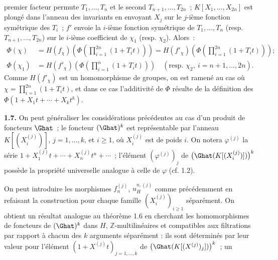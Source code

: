 premier facteur permute \(T_1,\ldots,T_n\) et le second \(T_{n+1},\ldots,T_{2n}\)~; \(K[X_1,\ldots,X_{2n}]\) est plongé dans l'anneau des invariants en envoyant \(X_j\) sur le \(j\)-ième fonction symétrique des \(T_i\)~; \(f'\) envoie la \(i\)-ième fonction symétrique de \(T_1,\ldots,T_n\) (resp. \(T_{n+1},\ldots,T_{2n}\)) sur le \(i\)-ième coefficient de \(\chi_1\) (resp. \(\chi_2\)). Alors~:
\[
\begin{aligned}
\Phi(\chi)
&=H(f_\chi)\left(\Phi\left(\prod_{i=1}^{2n}(1+T_it)\right)\right)
=H(f'_\chi)\left(\Phi\left(\prod_{i=1}^{2n}(1+T_it)\right)\right);\\
\Phi(\chi_1) &=H(f'_\chi)\left(\Phi\left(\prod_{i=1}^{n}(1+T_it)\right)\right)\quad(\text{resp. }\chi_2,\ i=n+1,\ldots,2n).
\end{aligned}
\]
Comme \(H(f'_\chi)\) est un homomorphisme de groupes, on est ramené au cas où \(\chi=\prod_{i=1}^{2n}(1+T_it)\), et dans ce cas l'additivité de \(\Phi\) résulte de la définition des \(\Phi(1+X_1t+\cdots+X_k t^k)\).

\textbf{1.7.} On peut généraliser les considérations précédentes au cas d'un produit de foncteurs \(\Ghat\)~; le foncteur \((\Ghat)^k\) est représentable par l'anneau
\(K[(X_i^{(j)})]\), \(j=1,\ldots,k\), et \(i\geq 1\), où \(X_i^{(j)}\) est de poids \(i\). On notera \(\varphi^{(j)}\) la série \(1+X_1^{(j)}t+\cdots+X_n^{(j)}t^n+\cdots\)~; l'élément \((\varphi^{(j)})_j\) de \(\bigl(\Ghat(K[(X_i^{(j)})])\bigr)^k\) possède la propriété universelle analogue à celle de \(\varphi\) (cf. 1.2).

On peut introduire les morphismes \(f_n^{(j)}\), \(u_H^{n,(j)}\) comme précédemment en refaisant la construction pour chaque famille \((X_i^{(j)})_{i\geq 1}\) séparément. On obtient un résultat analogue au théorème 1.6 en cherchant les homomorphismes de foncteurs de \((\Ghat)^k\) dans \(H\), \(\mathbb Z\)-multilinéaires et compatibles aux filtrations par rapport à chacun des \(k\) arguments séparément : ils sont déterminés par leur valeur pour l'élément
\((1+X^{(j)}t)_{j=1,\ldots,k}\) de \(\bigl(\Ghat(K[(X^{(j)})_j])\bigr)^k\)~; un
